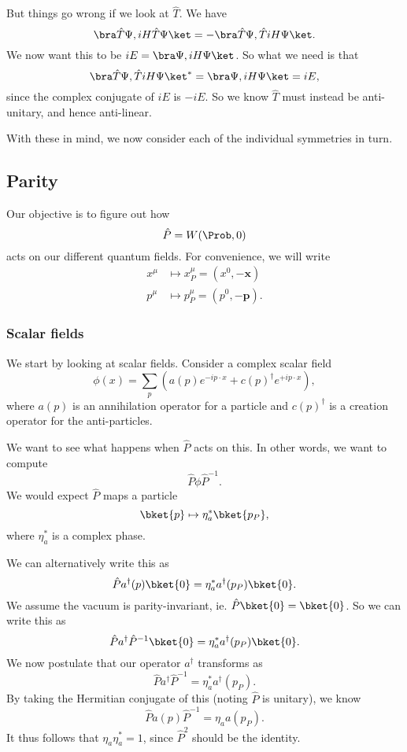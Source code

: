 \documentclass[a4paper]{article}
\begin{document}
But things go wrong if we look at $\hat{T}$. We have
\[
  \bra \hat{T} \Psi, iH \hat{T} \Psi\ket = -\bra \hat{T} \Psi, \hat{T} iH \Psi \ket.
\]
We now want this to be $iE = \bra \Psi, iH \Psi\ket$. So what we need is that
\[
  \bra \hat{T} \Psi, \hat{T} iH \Psi \ket^* = \bra \Psi, iH \Psi\ket = iE,
\]
since the complex conjugate of $iE$ is $-iE$. So we know $\hat{T}$ must instead be anti-unitary, and hence anti-linear.

With these in mind, we now consider each of the individual symmetries in turn.
\subsection{Parity}
Our objective is to figure out how
\[
  \hat{P} = W(\Prob, 0)
\]
acts on our different quantum fields. For convenience, we will write
\begin{align*}
  x^\mu &\mapsto x^\mu_P = (x^0, -\mathbf{x})\\
  p^\mu &\mapsto p^\mu_P = (p^0, -\mathbf{p}).
\end{align*}
\subsubsection*{Scalar fields}
We start by looking at scalar fields. Consider a complex scalar field
\[
  \phi(x) = \sum_p \left(a(p) e^{-ip\cdot x} + c(p)^\dagger e^{+i p\cdot x}\right),
\]
where $a(p)$ is an annihilation operator for a particle and $c(p)^\dagger$ is a creation operator for the anti-particles.

We want to see what happens when $\hat{P}$ acts on this. In other words, we want to compute
\[
  \hat{P} \phi \hat{P}^{-1}.
\]
We would expect $\hat{P}$ maps a particle
\[
  \bket{p} \mapsto \eta^*_a\bket{p_P},
\]
where $\eta^*_a$ is a complex phase.

We can alternatively write this as
\[
  \hat{P}a^\dagger(p) \bket{0} = \eta_a^* a^\dagger(p_P)\bket{0}.
\]
We assume the vacuum is parity-invariant, ie. $\hat{P}\bket{0} = \bket{0}$. So we can write this as
\[
  \hat{P}a^\dagger \hat{P}^{-1}\bket{0} = \eta_a^* a^\dagger(p_P) \bket{0}.
\]
We now postulate that our operator $a^\dagger$ transforms as
\[
  \hat{P}a^\dagger \hat{P}^{-1} = \eta_a^* a^\dagger(p_P).
\]
By taking the Hermitian conjugate of this (noting $\hat{P}$ is unitary), we know
\[
  \hat{P} a(p) \hat{P}^{-1} = \eta_a a(p_P).
\]
It thus follows that $\eta_a \eta_a^* = 1$, since $\hat{P}^2$ should be the identity.
\end{document}
